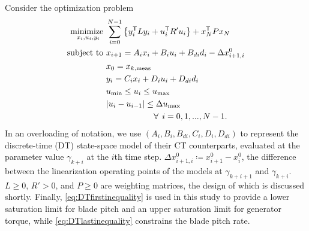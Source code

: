 \documentclass[letterpaper, 10 pt, conference]{ieeeconf}  %
\newcommand{\tran}{^{\mathsf{T}}}
\begin{document}
Consider the optimization problem
\begin{align}
\underset{\tiny{x_{i}, u_{i}, y_{i}}}{\text{minimize }} & \sum_{i=0}^{N-1}\left\{ y_{i}\tran L y_{i} + u_{i}\tran R' u_{i} \right\} + x_N\tran P x_N \label{eq:DTcost} \\
\text{subject to } & x_{i+1} = A_{i}x_{i} + B_{i}u_{i} + B_{di}d_{i} - \Delta x^0_{i+1, i} \label{eq:DTdynamics} \\
\empty & x_0 = x_{k,\mathrm{meas}} \label{eq:InitialCond} \\
\empty & y_{i} = C_{i}x_{i} + D_{i}u_{i} + D_{d{i}}d_{i} \label{eq:DToutput} \\
\empty & u_\mathrm{min} \leq u_i \leq u_\mathrm{max} \label{eq:DTfirstinequality} \\
\empty & |u_{i} - u_{i-1}| \leq \Delta u_\mathrm{max} \label{eq:DTlastinequality} \\
\empty & \hspace{20mm} \forall \: \: i = 0,1,...,N-1. \nonumber 
\end{align}
In an overloading of notation, we use $(A_i,B_i,B_{di},C_i,D_i,D_{di})$ to represent the discrete-time (DT) state-space model of their CT counterparts, evaluated at the parameter value $\gamma_{k+i}$ at the $i$th time step. $\Delta x^0_{i+1, i} \coloneqq x^0_{i+1} - x^0_i$, the difference between the linearization operating points of the models at $\gamma_{k+i+1}$ and $\gamma_{k+i}$. $L \geq 0$, $R' > 0$, and $P \geq 0$ are weighting matrices, the design of which is discussed shortly. Finally, \eqref{eq:DTfirstinequality} is used in this study to provide a lower saturation limit for blade pitch and an upper saturation limit for generator torque, while \eqref{eq:DTlastinequality} constrains the blade pitch rate.
\end{document}
